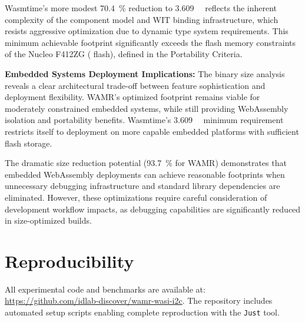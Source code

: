 Wasmtime's more modest \SI[round-precision=1]{70.4}{\percent} reduction to \SI{3.609}{\mega\byte} reflects the inherent complexity of the component model and WIT binding infrastructure, which resists aggressive optimization due to dynamic type system requirements. This minimum achievable footprint significantly exceeds the flash memory constraints of the Nucleo F412ZG ( flash), defined in the Portability Criteria.

\textbf{Embedded Systems Deployment Implications:} The binary size analysis reveals a clear architectural trade-off between feature sophistication and deployment flexibility. WAMR's optimized  footprint remains viable for moderately constrained embedded systems, while still providing WebAssembly isolation and portability benefits. Wasmtime's \SI{3.609}{\mega\byte} minimum requirement restricts itself to deployment on more capable embedded platforms with sufficient flash storage.

The dramatic size reduction potential (\SI[round-precision=1]{93.7}{\percent} for WAMR) demonstrates that embedded WebAssembly deployments can achieve reasonable footprints when unnecessary debugging infrastructure and standard library dependencies are eliminated. However, these optimizations require careful consideration of development workflow impacts, as debugging capabilities are significantly reduced in size-optimized builds.

\section*{Reproducibility}
All experimental code and benchmarks are available at: \url{https://github.com/idlab-discover/wamr-wasi-i2c}. The repository includes automated setup scripts enabling complete reproduction with the \texttt{Just} tool.